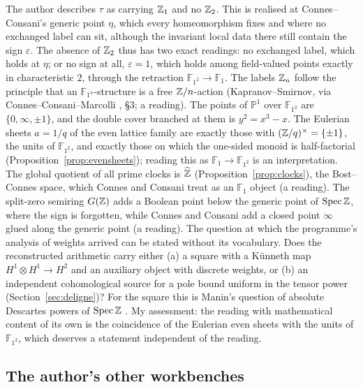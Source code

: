 The author describes $\tau$ as carrying $\mathbb{Z}_1$ and no $\mathbb{Z}_2$. This is realised at Connes--Consani's generic point $\eta$, which every homeomorphism fixes and where no exchanged label can sit, although the invariant local data there still contain the sign $\varepsilon$. The absence of $\mathbb{Z}_2$ thus has two exact readings: no exchanged label, which holds at $\eta$; or no sign at all, $\varepsilon=1$, which holds among field-valued points exactly in characteristic $2$, through the retraction $\mathbb{F}_{1^2}\to\mathbb{F}_1$.
The labels $\mathbb{Z}_n$ follow the principle that an $\mathbb{F}_{1^n}$-structure is a free $\mathbb{Z}/n$-action (Kapranov--Smirnov, via Connes--Consani--Marcolli \cite{CCMfun}, §3; a reading). The points of $\mathbb{P}^1$ over $\mathbb{F}_{1^2}$ are $\{0,\infty,\pm1\}$, and the double cover branched at them is $y^2=x^3-x$.
The Eulerian sheets $a=1/q$ of the even lattice family are exactly those with $(\mathbb{Z}/q)^\times=\{\pm1\}$, the units of $\mathbb{F}_{1^2}$, and exactly those on which the one-sided monoid is half-factorial (Proposition~\ref{prop:evensheets}); reading this as $\mathbb{F}_1\to\mathbb{F}_{1^2}$ is an interpretation.
The global quotient of all prime clocks is $\widehat{\mathbb{Z}}$ (Proposition~\ref{prop:clocks}), the Bost--Connes space, which Connes and Consani treat as an $\mathbb{F}_1$ object (a reading). The split-zero semiring $G(\mathbb{Z})$ adds a Boolean point below the generic point of $\operatorname{Spec}\mathbb{Z}$, where the sign is forgotten, while Connes and Consani add a closed point $\infty$ glued along the generic point (a reading).
The question at which the programme's analysis of weights arrived can be stated without its vocabulary. Does the reconstructed arithmetic carry either (a) a square with a Künneth map $H^1\otimes H^1\to H^2$ and an auxiliary object with discrete weights, or (b) an independent cohomological source for a pole bound uniform in the tensor power (Section~\ref{sec:deligne})? For the square this is Manin's question of absolute Descartes powers of $\operatorname{Spec}\mathbb{Z}$ \cite{Manin}.
My assessment: the reading with mathematical content of its own is the coincidence of the Eulerian even sheets with the units of $\mathbb{F}_{1^2}$, which deserves a statement independent of the reading.

\subsection{The author's other workbenches}\label{ssec:overlaps}

